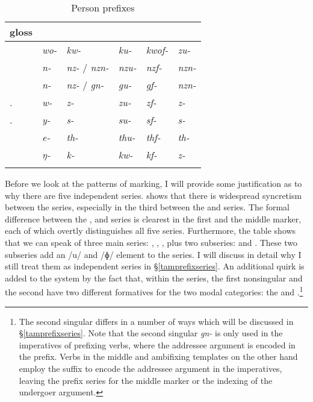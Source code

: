 \begin{table}
\caption{Person prefixes}
\label{perspref}
	\begin{tabularx}{\textwidth}{XXXXXl}
		\lsptoprule
		{gloss} &\Alph &\Bet &\Betaone &\Betatwo &\Gam\\\midrule
		\Fsg &\emph{wo-} &\emph{kw-} &\emph{ku-} &\emph{kwof-} &\emph{zu-}\\
		\Fnsg &\emph{n-} &\emph{nz-} / \emph{nzn-} &\emph{nzu-} &\emph{nzf-} &\emph{nzn-}\\
		\Ssg &\emph{n-}	&\emph{nz-} / \emph{gn-} &\emph{gu-} &\emph{gf-} &\emph{nzn-}\\
		\Tsg.\F &\emph{w-} &\emph{z-} &\emph{zu-} &\emph{zf-} &\emph{z-}\\
		\Tsg.\Masc &\emph{y-} &\emph{s-} &\emph{su-} &\emph{sf-} &\emph{s-}\\
		\Stnsg &\emph{e-} &\emph{th-} &\emph{thu-} &\emph{thf-} &\emph{th-}\\
		\M &\emph{ŋ-} &\emph{k-} &\emph{kw-} &\emph{kf-} &\emph{z-}\\
		\lspbottomrule
	\end{tabularx}
\end{table}%

Before we look at the patterns of  marking, I will provide some justification as to why there are five independent series.  shows that there is widespread syncretism between the series, especially in the third  between the \Bet{} and \Gam{} series. The formal difference between the \Alph, \Bet{} and \Gam{} series is clearest in the first   and the middle marker, each of which overtly distinguishes all five series. Furthermore, the table shows that we can speak of three main series: \Alph, \Bet, \Gam{}, plus two subseries: \Betaone{} and \Betatwo. These two subseries add an /u/ and /ɸ/ element to the \Bet{} series. I will discuss in detail why I still treat them as independent series in {\S}\ref{tamprefixseries}. An additional quirk is added to the system by the fact that, within the \Bet{} series, the first nonsingular and the second  have two different formatives for the two modal categories: the  and .\footnote{The second singular differs in a number of ways which will be discussed in {\S}\ref{tamprefixseries}. Note that the second singular \emph{gn-} is only used in the imperatives of prefixing verbs, where the addressee argument is encoded in the prefix. Verbs in the middle and ambifixing templates on the other hand employ the suffix to encode the addressee argument in the imperatives, leaving the prefix \Bet{} series for the middle marker or the indexing of the undergoer argument.}

